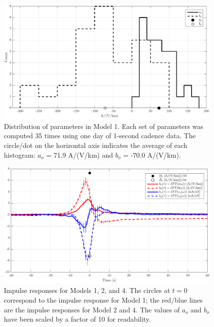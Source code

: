 \documentclass[draft,linenumbers]{agujournal2018}
\begin{document}
\begin{figure}[h]
\centering
\includegraphics[width=\textwidth]{figures/plot_model_summary_aobo_histograms-options-1.pdf}
\caption{Distribution of parameters in Model 1. Each set of parameters was computed 35 times using one day of 1-second cadence data. The circle/dot on the horizontal axis indicates the average of each histogram: $a_o$ = 71.9 A/(V/km) and $b_o$ = -70.0 A/(V/km).}
\label{histogram}
\end{figure}

\begin{figure}[h]
\centering
\includegraphics[width=\textwidth]{figures/plot_model_summary_H-options-1.pdf}
\caption{Impulse responses for Models 1, 2, and 4. The circles at $t = 0$ correspond to the impulse response for Model 1; the red/blue lines are the impulse responses for Model 2 and 4. The values of $a_o$ and $b_o$ have been scaled by a factor of 10 for readability.}
\label{H}
\end{figure}
\end{document}
